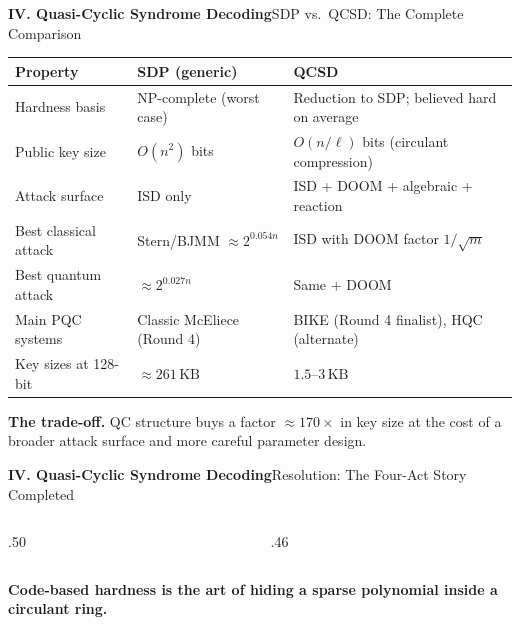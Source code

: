 \begin{frame}[shrink=5]{\textbf{IV. Quasi-Cyclic Syndrome Decoding}}{SDP vs.\ QCSD: The Complete Comparison}
\begin{center}
\renewcommand{\arraystretch}{1.28}
\begin{tabular}{p{}p{}p{}}
\toprule
Property & SDP (generic) & QCSD \\
\midrule
Hardness basis & NP-complete (worst case) & Reduction to SDP; believed hard on average \\
Public key size & $O(n^2)$ bits & $O(n/\ell)$ bits (circulant compression) \\
Attack surface & ISD only & ISD + DOOM + algebraic + reaction \\
Best classical attack & Stern/BJMM $\approx 2^{0.054n}$ & ISD with DOOM factor $1/\sqrt{m}$ \\
Best quantum attack & $\approx 2^{0.027n}$ & Same + DOOM \\
Main PQC systems & Classic McEliece (Round 4) & BIKE (Round 4 finalist), HQC (alternate) \\
Key sizes at 128-bit & $\approx 261\,\text{KB}$ & $1.5$--$3\,\text{KB}$ \\
\bottomrule
\end{tabular}
\end{center}
\vspace{-.1cm}
\textbf{The trade-off.}\; QC structure buys a factor $\approx 170\times$ in key size
at the cost of a broader attack surface and more careful parameter design.
\end{frame}

\begin{frame}{\textbf{IV. Quasi-Cyclic Syndrome Decoding}}{Resolution: The Four-Act Story Completed}
\small
\begin{columns}[T,onlytextwidth]
\begin{column}{.50\textwidth}
\end{column}
\begin{column}{.46\textwidth}
\end{column}
\end{columns}
\bigskip
\begin{center}
\textbf{\large Code-based hardness is the art of hiding a sparse polynomial inside a circulant ring.}
\end{center}
\end{frame}
